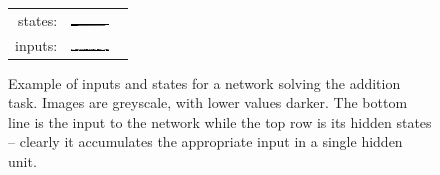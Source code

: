 \begin{figure}
\centering
\begin{tabu} to \textwidth {rX}
states: & \includegraphics[width=0.75\textwidth]{exps/addition/states0} \\
inputs: & \includegraphics[width=0.75\textwidth]{exps/addition/inputs0}
\end{tabu}

\caption[Addition example]{Example of inputs and states for a network solving the addition task.
Images are greyscale, with lower values darker. The bottom line is the input to the network while the
top row is its hidden states -- clearly it accumulates the appropriate input in a single hidden unit.}
\label{fig:additionpics}
\end{figure}

